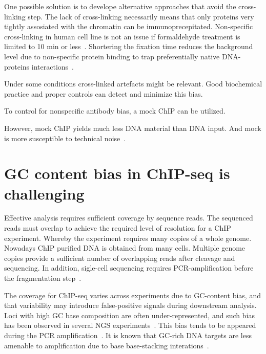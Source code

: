 One possible solution is to develope alternative approaches that avoid the cross-linking step.
The lack of cross-linking necessarily means that only proteins very tightly assosiated with the chromatin can be immunoprecepitated.
Non-specific cross-linking in human cell line is not an issue if formaldehyde treatment is limited to 10 min or less~\cite{}.
Shortering the fixation time reduces the background level due to non-specific protein binding to trap preferentially native DNA-proteins interactions~\cite{baranello2016chip}.

Under some conditions cross-linked artefacts might be relevant.
Good biochemical practice and proper controls can detect and minimize this bias.

To control for nonspecific antibody bias, a mock ChIP can be utilized.

However, mock ChIP yields much less DNA material than DNA input.
And mock is more susceptible to technical noise~\cite{kidder2011chip, landt2012chip}.


\section{GC content bias in ChIP-seq is challenging}

Effective analysis requires sufficient coverage by sequence reads. 
The sequenced reads must overlap to achieve the required level of resolution for a ChIP experiment.
Whereby the experiment requires many copies of a whole genome.
Nowadays ChIP purified DNA is obtained from many cells.
Multiple genome copies provide a sufficient number of overlapping reads after cleavage and sequencing.
In addition, sigle-cell sequencing requires PCR-amplification before the fragmentation step~\cite{clark2016single}.

The coverage for ChIP-seq varies across experiments due to GC-content bias, and that variability may introduce false-positive signals during downstream analysis.
Loci with high GC base composition are often under-represented, and such bias has been observed in several NGS experiments~\cite{benjamini2012summarizing}\cite{dohm2008substantial}\cite{teng2017accounting}.
This bias tends to be appeared during the PCR amplification~\cite{ross2013characterizing}.
It is known that GC-rich DNA targets are less amenable to amplification due to base base-stacking interations~\cite{yakovchuk2006base}.


